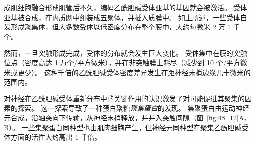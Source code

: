 成肌细胞融合形成肌管后不久，编码乙酰胆碱受体亚基的基因就会被激活。
受体亚基被合成，在内质网中组装成五聚体，并插入质膜中。
如上所述，一些受体自发形成聚集体，但大多数受体以低密度分布在整个膜中，大约每微米 2 万 1 千个。


然而，一旦突触形成完成，受体的分布就会发生巨大变化。
受体集中在膜的突触位点（密度高达 1 万个/平方微米），并在非突触膜上耗尽（减少到 10 个/平方微米或更少）。
这种千倍的乙酰胆碱受体密度差异发生在距神经末梢边缘几十微米的范围内。


对神经在乙酰胆碱受体重新分布中的关键作用的认识激发了对可能促进其聚集的因素的探索。
这一探索导致了一种蛋白聚糖\textit{聚集蛋白}的发现。
集聚蛋白由运动神经元合成，沿轴突向下传输，从神经末梢释放，并并入突触间隙（图~\ref{fig:48_12}A、B）。
一些集聚蛋白同种型也由肌肉细胞产生，但神经元同种型在聚集乙酰胆碱受体方面的活性大约高出 1 千倍。


